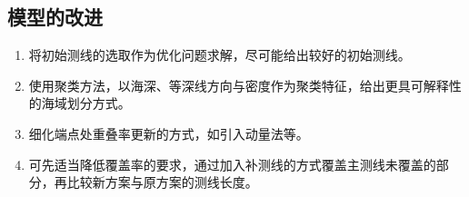 \documentclass[withoutpreface,bwprint]{cumcmthesis} %
\begin{document}
        \subsection{模型的改进}
        \begin{enumerate}
            \item 将初始测线的选取作为优化问题求解，尽可能给出较好的初始测线。
            \item 使用聚类方法，以海深、等深线方向与密度作为聚类特征，给出更具可解释性的海域划分方式。
            \item 细化端点处重叠率更新的方式，如引入动量法等。
            \item 可先适当降低覆盖率的要求，通过加入补测线的方式覆盖主测线未覆盖的部分，再比较新方案与原方案的测线长度。
        \end{enumerate}
        
    
\end{document}
